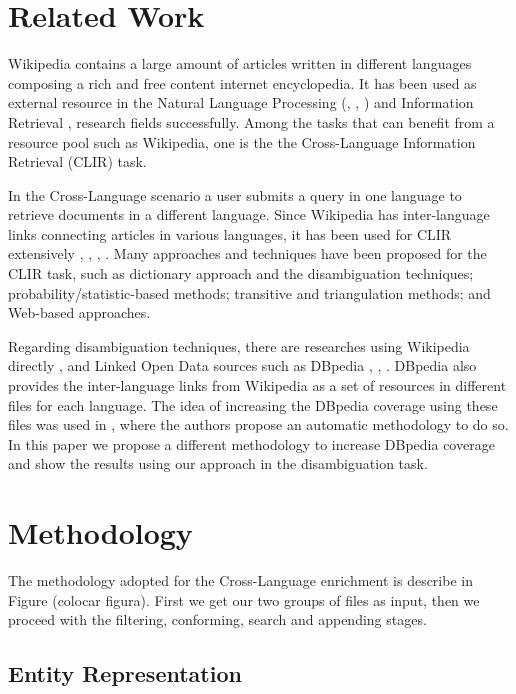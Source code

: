 \documentclass[10pt,a4paper]{llncs}
\begin{document}

\section{Related Work}

Wikipedia contains a large amount of articles written in different languages composing a rich and free content internet encyclopedia. It has been used as external resource in the Natural Language Processing (\cite{buscaldi_rosso}, \cite{mihalcea}, \cite{erdmann}) and Information Retrieval \cite{egozi}, \cite{milne} research fields successfully. Among the tasks that can benefit from a resource pool such as Wikipedia, one is the the Cross-Language Information Retrieval (CLIR) task. 

In the Cross-Language scenario a user submits a query in one language to retrieve documents in a different language. Since Wikipedia has inter-language links connecting articles in various languages, it has been used for CLIR extensively \cite{sorg}, \cite{nguyen}, \cite{nie}, \cite{braschler}. Many approaches and techniques have been proposed for the CLIR task, such as dictionary approach and the disambiguation techniques; probability/statistic-based methods; transitive and triangulation methods; and Web-based approaches. 

Regarding disambiguation techniques, there are researches using Wikipedia directly \cite{mihalcea}, \cite{li} and Linked Open Data sources such as DBpedia \cite{villar}, \cite{hakimov}, \cite{mendes}. DBpedia also provides the inter-language links from Wikipedia as a set of resources in different files for each language. The idea of increasing the DBpedia coverage using these files was used in \cite{aprosio}, where the authors propose an automatic methodology to do so. In this paper we propose a different methodology to increase DBpedia coverage and show the results using our approach in the disambiguation task.

\section{Methodology}

The methodology adopted for the Cross-Language enrichment is describe in Figure (colocar figura). First we get our two groups of files as input, then we proceed with the filtering, conforming, search and appending stages.

\subsection{Entity Representation}
\end{document}
